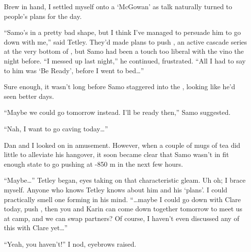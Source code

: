 Brew in hand, I settled myself onto a `McGowan' as
talk naturally turned to people's plans for the day.

``Samo's in a pretty bad shape, but I think I've managed to persuade him
to go down with me,'' said Tetley. They'd made plans to push
, an active cascade series at the very bottom of
, but Samo had been a touch too liberal with the vino
the night before. ``I messed up last night,'' he continued, frustrated.
``All I had to say to him was `Be Ready', before I went to bed\ldots{}''

Sure enough, it wasn't long before Samo staggered into the , looking
like he'd seen better days.

``Maybe we could go tomorrow instead. I'll be ready then,'' Samo
suggested.

``Nah, I want to go caving today\ldots{}''

Dan and I looked on in amusement. However, when a couple of mugs of tea
did little to alleviate his hangover, it soon became clear that Samo
wasn't in fit enough state to go pushing at -850 m in the next few
hours.

``Maybe\ldots{}'' Tetley began, eyes taking on that characteristic
gleam. Uh oh; I brace myself. Anyone who knows Tetley knows about him
and his `plans'. I could practically smell one forming in his mind.
``\ldots{}maybe I could go down with Clare today, push
, then you and Karin can come down together tomorrow
to meet us at camp, and we can swap partners? Of course, I haven't even
discussed any of this with Clare yet\ldots{}''

``Yeah, you haven't!'' I nod, eyebrows raised.

